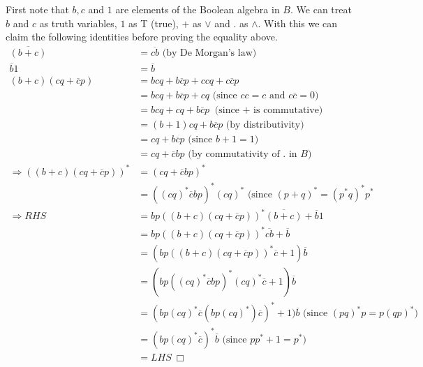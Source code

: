 First note that $b, c$ and $1$ are elements of the Boolean algebra in $B$. We can treat $b$ and $c$ as truth variables, $1$ as T (true), $+$ as $\vee$ and $.$ as $\wedge$. With this we can claim the following identities before proving the equality above.
\begin{align*}
\overline{(b+c)} &= \overline {cb} \text{ (by De Morgan's law)}\\
\overline b 1 &= \overline b\\
(b + c)(cq + \overline c p) &= bcq + b \overline c p + ccq + c \overline c p\\
&= bcq + b \overline c p + cq \text{ (since $cc = c$ and $c \overline c = 0$)}\\
&= bcq + cq + b \overline c p \text{ (since $+$ is commutative)}\\
&= (b+1)cq + b \overline c p \text{ (by distributivity)}\\
&= cq + b \overline c p \text{ (since $b + 1 = 1$)}\\
&= cq + \overline c b p \text{ (by commutativity of $.$ in $B$)}\\
\Rightarrow ((b + c)(cq + \overline c p))^* &= (cq + \overline c b p)^*\\
&= ((cq)^*\overline c b p)^* (cq)^* \text{ (since $(p+q)^* = (p^*q)^*p^*$}\\
\Rightarrow RHS &= bp((b + c)(cq + \overline c p))^*\overline{(b+c)}+ \overline b 1\\
&= bp((b + c)(cq + \overline c p))^*\overline{cb}+ \overline b\\
&= (bp((b + c)(cq + \overline c p))^*\overline c + 1)\overline b\\
&= (bp((cq)^*\overline c b p)^* (cq)^*\overline c + 1)\overline b\\
&= (bp(cq)^*\overline c (b p (cq)^*)\overline c)^* + 1)\overline b \text{ (since $(pq)^*p = p(qp)^*$)}\\
&= (bp(cq)^*\overline c)^*\overline b \text{ (since $pp^* +1 = p^*$)}\\
&= LHS~\Box
\end{align*}